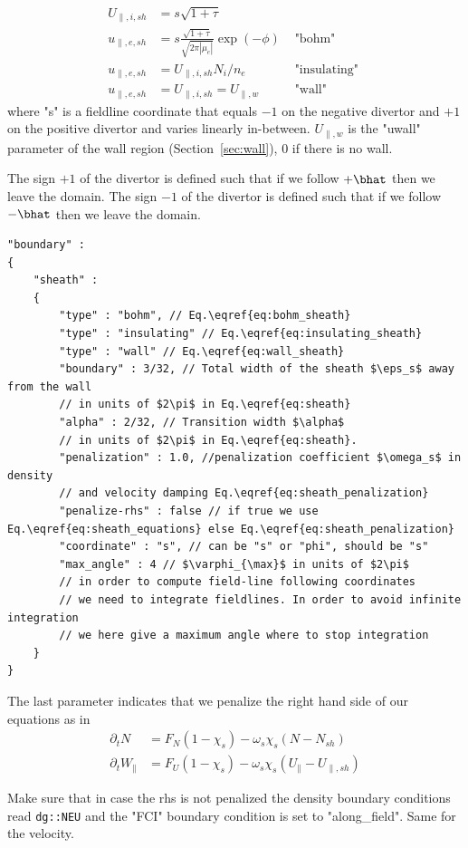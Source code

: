 \begin{align}
    U_{\parallel,i, sh} &= s\sqrt{1+\tau} \\
    u_{\parallel,e, sh} &= s\frac{\sqrt{1+\tau}}{\sqrt{2\pi|\mu_e|}}\exp(-\phi) &\text{ "bohm" } \label{eq:bohm_sheath}\\
    u_{\parallel,e, sh} &= U_{\parallel,i,sh}N_i/n_e &\text{ "insulating" } \label{eq:insulating_sheath} \\
    u_{\parallel,e, sh} &= U_{\parallel,i,sh} = U_{\parallel,w} &\text{ "wall" } \label{eq:wall_sheath}
\end{align}
where "s" is a fieldline coordinate that equals $-1$ on the negative divertor and $+1$ on the positive divertor
and varies linearly in-between.
$U_{\parallel,w}$ is the "uwall" parameter of the wall region (Section~\ref{sec:wall}), $0$ if there is no wall.
\begin{tcolorbox}[title=Note]
    The sign $+1$ of the divertor is defined such that if we follow $+\bhat$
    then we leave the domain.
    The sign $-1$ of the divertor is defined such that if we follow $-\bhat$
    then we leave the domain.
\end{tcolorbox}
\begin{verbatim}
"boundary" :
{
    "sheath" :
    {
        "type" : "bohm", // Eq.\eqref{eq:bohm_sheath}
        "type" : "insulating" // Eq.\eqref{eq:insulating_sheath}
        "type" : "wall" // Eq.\eqref{eq:wall_sheath}
        "boundary" : 3/32, // Total width of the sheath $\eps_s$ away from the wall
        // in units of $2\pi$ in Eq.\eqref{eq:sheath}
        "alpha" : 2/32, // Transition width $\alpha$
        // in units of $2\pi$ in Eq.\eqref{eq:sheath}.
        "penalization" : 1.0, //penalization coefficient $\omega_s$ in density
        // and velocity damping Eq.\eqref{eq:sheath_penalization}
        "penalize-rhs" : false // if true we use Eq.\eqref{eq:sheath_equations} else Eq.\eqref{eq:sheath_penalization}
        "coordinate" : "s", // can be "s" or "phi", should be "s"
        "max_angle" : 4 // $\varphi_{\max}$ in units of $2\pi$
        // in order to compute field-line following coordinates
        // we need to integrate fieldlines. In order to avoid infinite integration
        // we here give a maximum angle where to stop integration
    }
}
\end{verbatim}
\noindent
The last parameter indicates that we penalize the right hand side of our equations
as in
\begin{subequations} \label{eq:sheath_equations}
\begin{align}
    \partial_t N &= F_N ( 1-\chi_s)  -\omega_s\chi_s (N-N_{sh})\\
    \partial_t W_\parallel &= F_U  ( 1 - \chi_s) -\omega_s\chi_s (U_\parallel-
        U_{\parallel,sh})
\end{align}
\end{subequations}
\begin{tcolorbox}[title=Note]
    Make sure that in case the rhs is not penalized the density boundary conditions
    read \texttt{dg::NEU} and the "FCI" boundary condition is set to "along\_field".
    Same for the velocity.
\end{tcolorbox}

